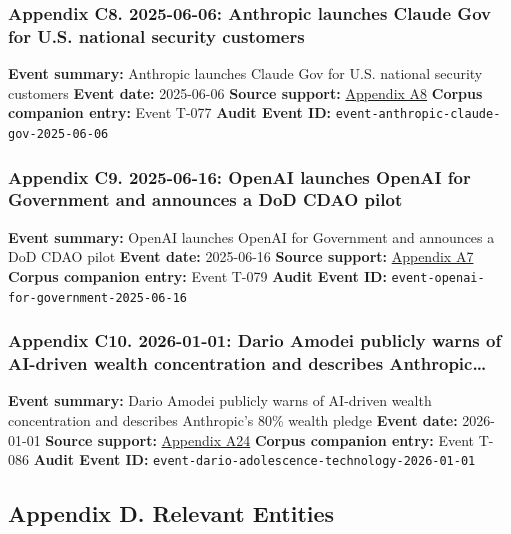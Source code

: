 \documentclass[
  american,
  11pt,
  letterpaper,
]{article}
\begin{document}
\subsubsection{Appendix C8. 2025-06-06: Anthropic launches Claude Gov
for U.S. national security
customers}\label{ch-10-appendix-c8-2025-06-06-anthropic-launches-claude-gov-for-u-s-national-security-customers}

\textbf{Event summary:} Anthropic launches Claude Gov for U.S. national
security customers \textbf{Event date:} 2025-06-06 \textbf{Source
support:}
\hyperref[ch-10-appendix-a8-claude-gov-models-for-u-s-national-security-customers]{Appendix
A8} \textbf{Corpus companion entry:} Event T-077 \textbf{Audit Event
ID:} \texttt{event-anthropic-claude-gov-2025-06-06}

\subsubsection{Appendix C9. 2025-06-16: OpenAI launches OpenAI for
Government and announces a DoD CDAO
pilot}\label{ch-10-appendix-c9-2025-06-16-openai-launches-openai-for-government-and-announces-a-dod-cdao-pilot}

\textbf{Event summary:} OpenAI launches OpenAI for Government and
announces a DoD CDAO pilot \textbf{Event date:} 2025-06-16
\textbf{Source support:}
\hyperref[ch-10-appendix-a7-introducing-openai-for-government]{Appendix
A7} \textbf{Corpus companion entry:} Event T-079 \textbf{Audit Event
ID:} \texttt{event-openai-for-government-2025-06-16}

\subsubsection{Appendix C10. 2026-01-01: Dario Amodei publicly warns of
AI-driven wealth concentration and describes
Anthropic\ldots{}}\label{ch-10-appendix-c10-2026-01-01-dario-amodei-publicly-warns-of-ai-driven-wealth-concentration-and-describes-anthropic-s-80-wealth-pledge}

\textbf{Event summary:} Dario Amodei publicly warns of AI-driven wealth
concentration and describes Anthropic's 80\% wealth pledge \textbf{Event
date:} 2026-01-01 \textbf{Source support:}
\hyperref[ch-10-appendix-a24-the-adolescence-of-technology]{Appendix
A24} \textbf{Corpus companion entry:} Event T-086 \textbf{Audit Event
ID:} \texttt{event-dario-adolescence-technology-2026-01-01}

\subsection{Appendix D. Relevant
Entities}\label{appendix-d.-relevant-entities-10}
\end{document}
